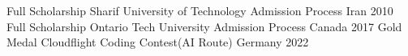


\begin{cvhonors}
  \cvhonor
  {Full Scholarship} %
  {Sharif University of Technology Admission Process} %
  {Iran} %
  {2010} %
\cvhonor
  {Full Scholarship} %
  {Ontario Tech University Admission Process} %
  {Canada} %
  {2017} %
\cvhonor
  {Gold Medal} %
  {Cloudflight Coding Contest(AI Route)} %
  {Germany} %
  {2022} %


\end{cvhonors}